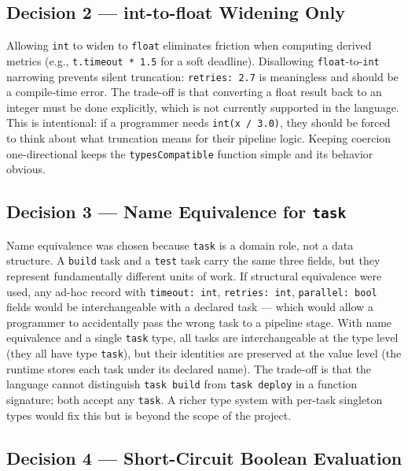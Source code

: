 \documentclass[10pt,a4paper]{article}
\begin{document}
\subsection{Decision 2 --- int-to-float Widening Only}

Allowing \texttt{int} to widen to \texttt{float} eliminates friction when computing derived
metrics (e.g., \texttt{t.timeout * 1.5} for a soft deadline). Disallowing
\texttt{float}-to-\texttt{int} narrowing prevents silent truncation: \texttt{retries: 2.7}
is meaningless and should be a compile-time error. The trade-off is that converting a float
result back to an integer must be done explicitly, which is not currently supported in the
language. This is intentional: if a programmer needs \texttt{int(x / 3.0)}, they should be
forced to think about what truncation means for their pipeline logic. Keeping coercion
one-directional keeps the \texttt{typesCompatible} function simple and its behavior obvious.

\subsection{Decision 3 --- Name Equivalence for \texttt{task}}

Name equivalence was chosen because \texttt{task} is a domain role, not a data structure.
A \texttt{build} task and a \texttt{test} task carry the same three fields, but they represent
fundamentally different units of work. If structural equivalence were used, any ad-hoc record
with \texttt{timeout: int}, \texttt{retries: int}, \texttt{parallel: bool} fields would be
interchangeable with a declared task --- which would allow a programmer to accidentally pass
the wrong task to a pipeline stage. With name equivalence and a single \texttt{task} type,
all tasks are interchangeable at the type level (they all have type \texttt{task}), but their
identities are preserved at the value level (the runtime stores each task under its declared
name). The trade-off is that the language cannot distinguish \texttt{task build} from
\texttt{task deploy} in a function signature; both accept any \texttt{task}. A richer type
system with per-task singleton types would fix this but is beyond the scope of the project.

\subsection{Decision 4 --- Short-Circuit Boolean Evaluation}
\end{document}

